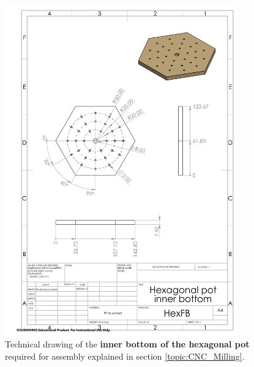 \documentclass[12pt]{extarticle} %
\begin{document}
\begin{figure}[ht]
    \centering
    \includegraphics[width=0.9\textwidth]{images/technical_drawings/Hexagonal_pot_inner_bottom.png}
    \caption{Technical drawing of the \textbf{inner bottom of the hexagonal pot} required for assembly explained in section \ref{topic:CNC_Milling}.}
    \label{technical_drawing:hex_pot_inner_bottom}
\end{figure}
\end{document}
